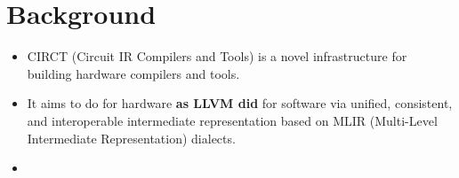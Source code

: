 
\section{Background}

\begin{frame}
	\begin{itemize}
		\item CIRCT (Circuit IR Compilers and Tools) is a novel infrastructure for building hardware compilers and tools.
		\item It aims to do for hardware \textbf{as LLVM did} for software via unified, consistent, and interoperable intermediate representation based on MLIR (Multi-Level Intermediate Representation) dialects.
		\item 
	\end{itemize}
\end{frame}